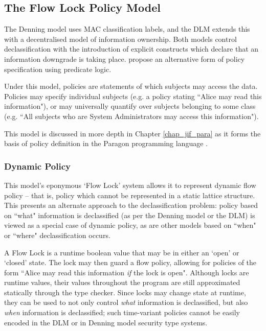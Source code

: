 \subsection{The Flow Lock Policy Model}

The Denning model uses MAC classification labels, and the DLM extends this with a decentralised model of information ownership. Both models control declassification with the introduction of explicit constructs which declare that an information downgrade is taking place. \citeauthor{broberg2006flow} \cite{broberg2006flow} propose an alternative form of policy specification using predicate logic.

Under this model, policies are statements of which subjects may access the data. Policies may specify individual subjects (e.g. a policy stating ``Alice may read this information"), or may universally quantify over subjects belonging to some class (e.g. ``All subjects who are System Administrators may access this information").

This model is discussed in more depth in Chapter \ref{chap_jif_para} as it forms the basis of policy definition in the Paragon programming language \cite{broberg2013paragon}.

\subsubsection{Dynamic Policy}

This model's eponymous `Flow Lock' system allows it to represent dynamic flow policy -- that is, policy which cannot be represented in a static lattice structure. This presents an alternate approach to the declassification problem:  policy based on ``what" information is declassified (as per the Denning model or the DLM) is viewed as a special case of dynamic policy, as are other models based on ``when" or ``where" declassification occurs.

A Flow Lock is a runtime boolean value that may be in either an `open' or `closed' state. The lock may then guard a flow policy, allowing for policies of the form ``Alice may read this information \textit{if} the lock  is open". Although locks are runtime values, their values throughout the program are still approximated statically through the type checker. Since locks may change state at runtime, they can be used to not only control \textit{what} information is declassified, but also \textit{when} information is declassified; such time-variant policies cannot be easily encoded in the DLM or in Denning model security type systems.

